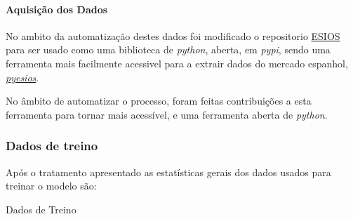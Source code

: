 \paragraph{Aquisição dos Dados}
\text{ }  \par

No ambito da automatização destes dados foi modificado o repositorio \href{https://github.com/SanPen/\gls{ESIOS}}{\gls{ESIOS}} para ser usado como uma biblioteca de \textit{python}, aberta, em \textit{pypi}, sendo uma ferramenta mais facilmente acessivel para a extrair dados do mercado espanhol, \href{https://pypi.org/project/pyesios/}{\textit{pyesios}}.\par
No âmbito de automatizar o processo, foram feitas contribuições a esta ferramenta para tornar mais acessível, e uma ferramenta aberta de \textit{python}.\par


\thispagestyle{plain}
 \label{se:dadoscrus}



\thispagestyle{plain}
 \label{se:tratamentodados}

\subsubsection{Dados de treino}

Após o tratamento apresentado as estatísticas gerais dos dados usados para treinar o modelo são:

\begin{table}[H]
    \centering
    \caption{Dados de Treino}    
    \resizebox{\linewidth}{!}{}
    \end{table}


\thispagestyle{plain}
 \label{se:val_data}
